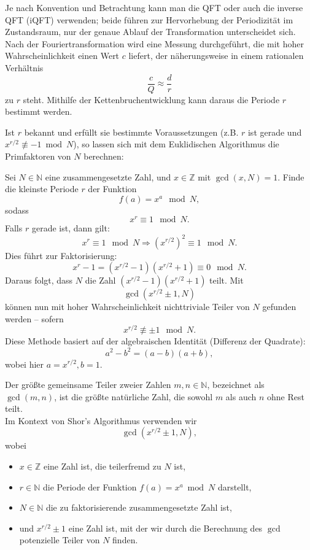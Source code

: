 {Je nach Konvention und Betrachtung kann man die QFT oder auch die inverse QFT (iQFT) verwenden; beide führen zur Hervorhebung der Periodizität im Zustandsraum, nur der genaue Ablauf der Transformation unterscheidet sich.\\

Nach der Fouriertransformation wird eine Messung durchgeführt, die mit hoher Wahrscheinlichkeit einen Wert \( c \) liefert, der näherungsweise in einem rationalen Verhältnis  
\[
\frac{c}{Q} \approx \frac{d}{r}
\]
zu \( r \) steht. Mithilfe der Kettenbruchentwicklung kann daraus die Periode \( r \) bestimmt werden.

Ist \( r \) bekannt und erfüllt sie bestimmte Voraussetzungen (z.B. \( r \) ist gerade und \( x^{r/2} \not\equiv -1 \bmod N \)), so lassen sich mit dem Euklidischen Algorithmus die Primfaktoren von \( N \) berechnen: 

Sei \( N \in \mathbb{N} \) eine zusammengesetzte Zahl, und \( x \in \mathbb{Z} \) mit \(\gcd(x, N) = 1\).  
Finde die kleinste Periode \( r \) der Funktion
\[
f(a) = x^a \mod N,
\]
sodass
\[
x^r \equiv 1 \mod N.
\]
Falls \( r \) gerade ist, dann gilt:
\[
x^r \equiv 1 \mod N \Rightarrow (x^{r/2})^2 \equiv 1 \mod N.
\]
Dies führt zur Faktorisierung:
\[
x^r - 1 = (x^{r/2} - 1)(x^{r/2} + 1) \equiv 0 \mod N.
\]
Daraus folgt, dass \( N \) die Zahl \( (x^{r/2} - 1)(x^{r/2} + 1) \) teilt.
Mit
\[
\gcd(x^{r/2} \pm 1, N)
\]
können nun mit hoher Wahrscheinlichkeit nichttriviale Teiler von \( N \) gefunden werden – sofern
\[
x^{r/2} \not\equiv \pm 1 \mod N.
\]
Diese Methode basiert auf der algebraischen Identität (Differenz der Quadrate):
\[
a^2 - b^2 = (a - b)(a + b),
\]
wobei hier \( a = x^{r/2}, b = 1 \).

\begin{definition}
Der größte gemeinsame Teiler zweier Zahlen \(m, n \in \mathbb{N}\), bezeichnet als \(\gcd(m,n)\), ist die größte natürliche Zahl, die sowohl \(m\) als auch \(n\) ohne Rest teilt.\\

Im Kontext von Shor's Algorithmus verwenden wir
\[
\gcd\left(x^{r/2} \pm 1, N\right),
\]
wobei
\begin{itemize}
    \item \(x \in \mathbb{Z}\) eine Zahl ist, die teilerfremd zu \(N\) ist,
    \item \(r \in \mathbb{N}\) die Periode der Funktion \(f(a) = x^a \bmod N\) darstellt,
    \item \(N \in \mathbb{N}\) die zu faktorisierende zusammengesetzte Zahl ist,
    \item und \(x^{r/2} \pm 1\) eine Zahl ist, mit der wir durch die Berechnung des \(\gcd\) potenzielle Teiler von \(N\) finden.
\end{itemize}
\end{definition}

}
